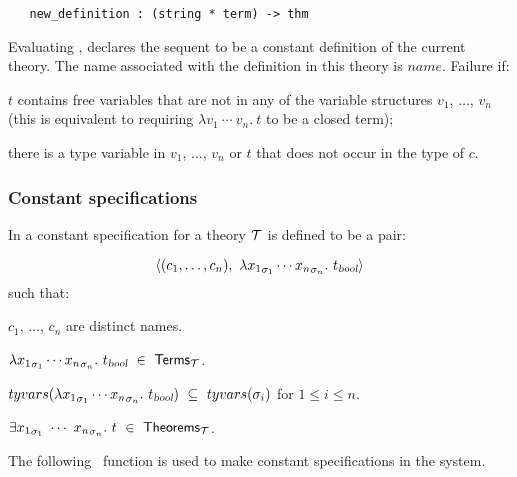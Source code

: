 \begin{holboxed}
\begin{verbatim}
   new_definition : (string * term) -> thm
\end{verbatim}
\end{holboxed}


\noindent Evaluating
 ,
declares the sequent
 to be a constant definition
of the current theory. The name associated with the definition in
this theory is $name$.
Failure if:
\begin{myenumerate}
\item $t$ contains free variables that are not in any of
the variable structures $v_1$, $\dots$, $v_n$ (this is equivalent
to requiring $\lambda v_1\ \cdots\ v_n.\  t$ to be a closed term);
\item there is a type variable in  $v_1$, $\dots$, $v_n$ or $t$
that does not occur in the type of $c$.
\end{myenumerate}

\subsubsection{Constant specifications}
\label{conspec}

%
%
In \LOGIC{} a constant specification for a theory ${\cal T}$
is defined to be a pair:

\[
\langle(c_1,\ldots,c_n),\ \lquant{{x_1}_{\sigma_1}
\cdots {x_n}_{\sigma_n}}t_{\ty{bool}}\rangle
\]
such that:

\begin{myenumerate}
\item $c_1$, $\dots$, $c_n$ are distinct names.
\item $\lambda {x_1}_{\sigma_1}
\cdots {x_n}_{\sigma_n}.\ t_{\textsl{bool}}\ \in\ {\sf Terms}_{\cal T}$.
\item $tyvars(\lquant{{x_1}_{\sigma_1}
\cdots {x_n}_{\sigma_n}}t_{\ty{bool}})\ \subseteq\ tyvars(\sigma_i)$ for
$1\leq i\leq n$.
\item $\equant{{x_1}_{\sigma_1}\ \cdots\ {x_n}_{\sigma_n}}t
\ \in\ {\sf Theorems}_{\cal T}$.
\end{myenumerate}
The following \ML\ function is used to make constant specifications in
the \HOL{} system.

